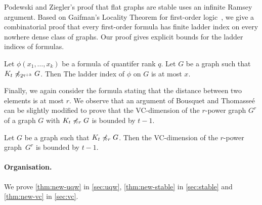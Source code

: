 Podewski and Ziegler's proof that flat graphs are stable uses an 
infinite Ramsey argument. Based on Gaifman's Locality Theorem for
first-order logic~\cite{gaifman1982local}, we give a combinatorial 
proof that every first-order formula has finite ladder index on every
nowhere dense class of graphs. Our proof gives explicit bounds for the
ladder indices of formulas. 

\begin{theorem}\label{thm:new-stable}
Let $\phi(x_1,\ldots, x_k)$ be a formula of quantifer rank $q$. 
Let $G$ be a graph such that $K_t\not\preccurlyeq_{2^{q+k}} G$. Then 
The ladder index of $\phi$ on $G$ is at most $x$. 
\end{theorem}

Finally, we again consider the formula stating that the distance
between two elements is at most $r$. 
We observe that an argument of Bousquet and 
Thomasse\'e~\cite{BousquetT15} can be slightly modified to prove that 
the VC-dimension of the $r$-power graph $G^r$ of a graph $G$
with $K_t\not\preccurlyeq_r G$ is bounded by $t-1$.

\begin{theorem}\label{thm:new-vc}
Let $G$ be a graph such that $K_t\not\preccurlyeq_r G$. Then the
VC-dimension of the $r$-power graph~$G^r$ is bounded by $t-1$. 
\end{theorem}

\paragraph{Organisation.}
We prove \cref{thm:new-uqw} in \cref{sec:uqw}, 
\cref{thm:new-stable} in \cref{sec:stable} and
\cref{thm:new-vc} in \cref{sec:vc}. 
